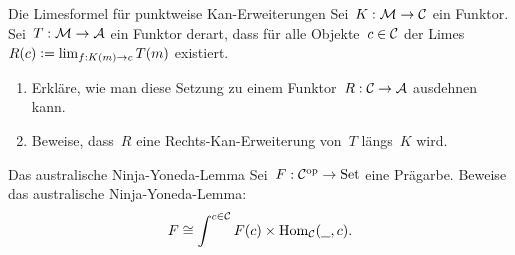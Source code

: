 \documentclass{uebblatt}
\begin{document}
\begin{aufgabe}{Die Limesformel für punktweise Kan-Erweiterungen}
Sei~$K : \mathcal{M} \to \mathcal{C}$ ein Funktor. Sei~$T : \mathcal{M} \to \mathcal{A}$ ein Funktor derart, dass
für alle Objekte~$c \in \mathcal{C}$ der Limes~$R(c) \vcentcolon= \lim_{f:K(m) \to c} T(m)$
existiert.
\begin{enumerate}
\item Erkläre, wie man diese Setzung zu einem Funktor~$R : \mathcal{C} \to \mathcal{A}$ ausdehnen
kann.
\item Beweise, dass~$R$ eine Rechts-Kan-Erweiterung von~$T$ längs~$K$ wird.
\end{enumerate}
\end{aufgabe}


\begin{aufgabe}{Das australische Ninja-Yoneda-Lemma}
Sei~$F : \mathcal{C}^{\mathrm{op}} \to \mathrm{Set}$ eine Prägarbe. Beweise das australische
Ninja-Yoneda-Lemma:
\[ F \cong \int^{c \in \mathcal{C}} F(c) \times \mathrm{Hom}_{\mathcal{C}}(\underline{\ \ }, c). \]
%
\end{aufgabe}
\end{document}
